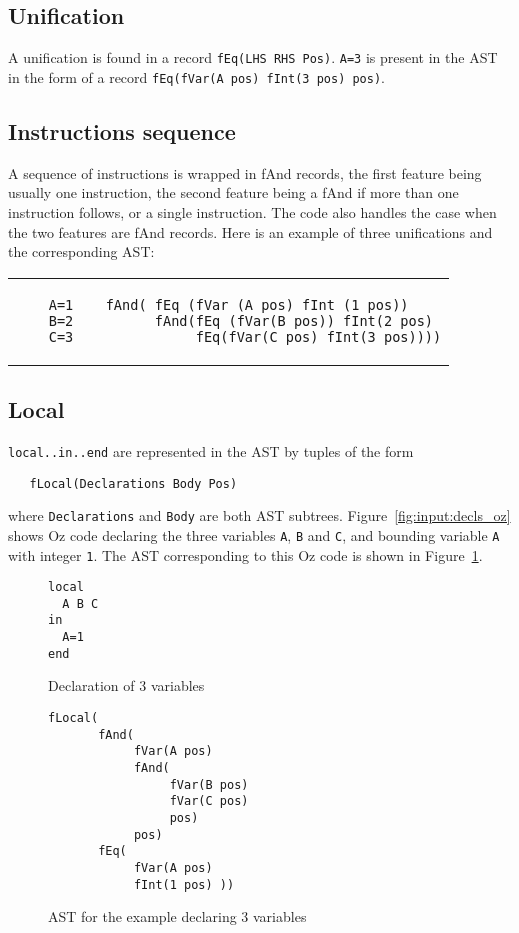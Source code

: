 \documentclass[a4paper]{memoir}
\begin{document}
\subsection{Unification}
A unification is found in a record \lstinline!fEq(LHS RHS Pos)!.
\lstinline!A=3! is present in the AST in the form of a record
\lstinline!fEq(fVar(A pos) fInt(3 pos) pos)!.

\subsection{Instructions sequence}
A sequence of instructions is wrapped in fAnd records, the first feature being usually one instruction, the second feature being a fAnd if more than one instruction follows,  or a single instruction. The code also handles the case when the two features are fAnd records. %
Here is an example of three unifications and the corresponding AST:\\
\begin{tabular}{ p{} p{} }
  \begin{lstlisting}
    A=1
    B=2
    C=3
  \end{lstlisting}
&
  \footnotesize{
  \begin{lstlisting}
  fAnd( fEq (fVar (A pos) fInt (1 pos))
        fAnd(fEq (fVar(B pos)) fInt(2 pos) 
             fEq(fVar(C pos) fInt(3 pos))))
  \end{lstlisting}
  }
\end{tabular}

\subsection{Local}\label{sec:input:flocal}
\lstinline!local..in..end! are represented in the AST by tuples of the form
\begin{lstlisting}
   fLocal(Declarations Body Pos)
\end{lstlisting}
where \lstinline!Declarations! and
\lstinline!Body! are both AST subtrees. 
Figure~\ref{fig:input:decls_oz} shows Oz code declaring the three variables
\lstinline!A!, \lstinline!B!
and \lstinline!C!, and bounding variable \lstinline!A! with integer
\lstinline!1!. The AST corresponding to this Oz code is shown in
Figure~\ref{fig:input:decls}.

\begin{figure}
\begin{lstlisting}
local
  A B C
in
  A=1
end
\end{lstlisting}
\caption{Declaration of 3 variables}
\label{fig:input:decls_oz}
\begin{lstlisting}
fLocal(
       fAnd(
            fVar(A pos) 
            fAnd(
                 fVar(B pos) 
                 fVar(C pos) 
                 pos) 
            pos) 
       fEq( 
            fVar(A pos) 
            fInt(1 pos) ))
\end{lstlisting}
\caption{AST for the example declaring 3 variables}
\label{fig:input:decls}
\end{figure}
\end{document}
